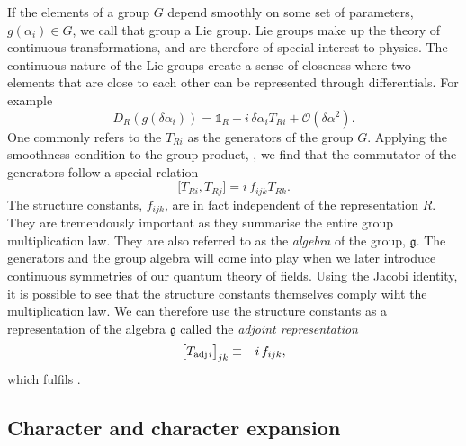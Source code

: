 If the elements of a group $G$ depend smoothly on some set of parameters,
$g(\alpha_i) \in G$, we call that group a Lie group. Lie groups make up the
theory of continuous transformations, and are therefore of special interest to
physics. The continuous nature of the Lie groups create a sense of closeness
where two elements that are close to each other can be represented through
differentials. For example
%
\begin{equation}
  D_R(g(\delta\alpha_i)) = \mathbb{1}_R + i\, \delta \alpha_i T_{Ri} +
    \mathcal{O}(\delta \alpha^2).
\end{equation}
%
One commonly refers to the $T_{Ri}$ as the generators of the group $G$. Applying
the smoothness condition to the group product, ,
we find that the commutator of the generators follow a special relation
%
\begin{equation} \label{eq:group_algebra}
  \big[ T_{Ri}, T_{Rj} \big] = i\, f_{ijk} T_{Rk}.
\end{equation}
%
The structure constants, $f_{ijk}$, are in fact independent of the
representation $R$. They are tremendously important as they summarise the entire
group multiplication law. They are also referred to as the \emph{algebra} of the
group, $\mathfrak{g}$. The generators and the group algebra will come into play
when we later introduce continuous symmetries of our quantum theory of fields.
Using the Jacobi identity, it is possible to see that the structure constants
themselves comply wiht the multiplication law. We can therefore use the structure
constants as a representation of the algebra $\mathfrak{g}$ called the
\emph{adjoint representation}
%
\begin{equation}
  \big[ T_{\text{adj}\hskip.2ex i} \big]_{jk} \equiv -i\, f_{ijk},
\end{equation}
%
which fulfils .

\subsection{Character and character expansion}

